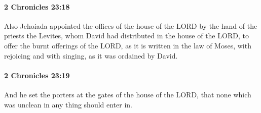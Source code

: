 		\paragraph{2 Chronicles 23:18} %
			\label{2CHRONICLES-23-18}

			Also Jehoiada appointed the offices of the house of the LORD by the hand of the priests the Levites, whom David had distributed in the house of the LORD, to offer the burnt offerings of the LORD, as it is written in the law of Moses, with rejoicing and with singing, as it was ordained by David.


		\paragraph{2 Chronicles 23:19} %
			\label{2CHRONICLES-23-19}

			And he set the porters at the gates of the house of the LORD, that none which was unclean in any thing should enter in.

